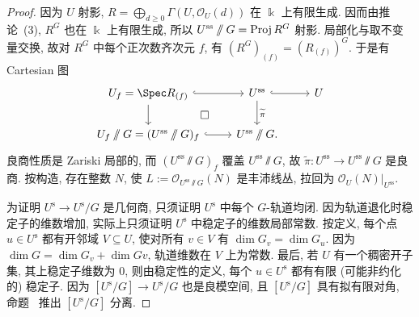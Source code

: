 \begin{proof}
因为 $U$ 射影, $R=\bigoplus_{d\geq0}\Gamma(U,\mathcal O_U(d))$ 在 $\Bbbk$ 上有限生成. 因而由推论~(3), $R^G$ 也在 $\Bbbk$ 上有限生成, 所以 $U^{\mathrm{ss}}\mathbin{/\mkern-6mu/} G=\operatorname{Proj} R^G$ 射影. 局部化与取不变量交换, 故对 $R^G$ 中每个正次数齐次元 $f$, 有 $(R^G)_{(f)}=(R_{(f)})^G$. 于是有 Cartesian 图
\[
\begin{tikzcd}[ampersand replacement=\&]
{U_f=\Spec R_{(f)}}\arrow[r,hook]\arrow[d]\arrow[dr,phantom,"\square"]\&U^{\mathrm{ss}}\arrow[r,hook]\arrow[d,"\widetilde\pi"]\&U\\
{U_f\sslash G=(U^{\mathrm{ss}}\sslash G)_f}\arrow[r,hook]\&{U^{\mathrm{ss}}\sslash G}.\&{}
\end{tikzcd}
\]
良商性质是 Zariski 局部的, 而 $(U^{\mathrm{ss}}\sslash G)_f$ 覆盖 $U^{\mathrm{ss}}\sslash G$, 故 $\widetilde\pi:U^{\mathrm{ss}}\to U^{\mathrm{ss}}\sslash G$ 是良商. 按构造, 存在整数 $N$, 使 $L:=\mathcal O_{U^{\mathrm{ss}}\sslash G}(N)$ 是丰沛线丛, 拉回为 $\mathcal O_U(N)|_{U^{\mathrm{ss}}}$.

为证明 $U^{\mathrm s}\to U^{\mathrm s}/G$ 是几何商, 只须证明 $U^{\mathrm s}$ 中每个 $G$-轨道均闭. 因为轨道退化时稳定子的维数增加, 实际上只须证明 $U^{\mathrm s}$ 中稳定子的维数局部常数. 按定义, 每个点 $u\in U^{\mathrm s}$ 都有开邻域 $V\subseteq U$, 使对所有 $v\in V$ 有 $\dim G_v=\dim G_u$. 因为 $\dim G=\dim G_v+\dim Gv$, 轨道维数在 $V$ 上为常数. 最后, 若 $U$ 有一个稠密开子集, 其上稳定子维数为 $0$, 则由稳定性的定义, 每个 $u\in U^{\mathrm s}$ 都有有限 (可能非约化的) 稳定子. 因为 $[U^{\mathrm s}/G]\to U^{\mathrm s}/G$ 也是良模空间, 且 $[U^{\mathrm s}/G]$ 具有拟有限对角, 命题~ 推出 $[U^{\mathrm s}/G]$ 分离.
\end{proof}
